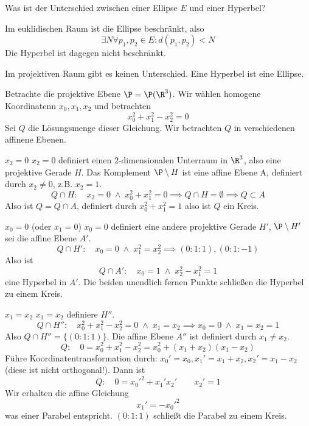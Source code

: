 \documentclass{mycourse}
\begin{document}
\begin{ex}[Quadriken]
	Was ist der Unterschied zwischen einer Ellipse $E$ und einer Hyperbel?

	Im euklidischen Raum ist die Ellipse beschränkt, also
	\[
		\exists N \forall p_1,p_2 \in E : d(p_1,p_2) < N
	\]
	Die Hyperbel ist dagegen nicht beschränkt.

	Im projektiven Raum gibt es keinen Unterschied.
	Eine Hyperbel ist eine Ellipse.

	Betrachte die projektive Ebene $\P = \P(\R^3)$.
	Wir wählen homogene Koordinatenn $x_0,x_1,x_2$ und betrachten
	\[
		x_0^2 + x_1^2 - x_2^2 = 0
	\]
	Sei $Q$ die Lösungsmenge dieser Gleichung.
	Wir betrachten $Q$ in verschiedenen affinene Ebenen.
	\begin{seg}{$x_2=0$}
		$x_2=0$ definiert einen $2$-dimensionalen Unterraum in $\R^3$, also eine projektive Gerade $H$.
		Das Komplement $\P\setminus H$ ist eine affine Ebene A, definiert durch $x_2 \neq 0$, z.B. $x_2=1$.
		\[
			Q \cap H : \quad x_2 = 0 \;\land\; x_0^2+x_1^2 = 0 \implies Q \cap H = \emptyset \implies Q \subset A
		\]
		Also ist $Q = Q \cap A$, definiert durch $x_0^2 + x_1^2 = 1$ also ist $Q$ ein Kreis.
	\end{seg}
	\begin{seg}{$x_0=0$ (oder $x_1=0$)}
		$x_0=0$ definiert eine andere projektive Gerade $H'$, $\P\setminus H'$ sei die affine Ebene $A'$.
		\[
			Q \cap H': \quad x_0 = 0 \;\land\; x_1^2 = x_2^2 \implies (0:1:1), (0:1:-1)
		\]
		Also ist
		\[
			Q \cap A' : \quad x_0=1 \;\land\; x_2^2-x_1^2=1
		\]
		eine Hyperbel in $A'$.
		Die beiden unendlich fernen Punkte schließen die Hyperbel zu einem Kreis.
	\end{seg}
	\begin{seg}{$x_1=x_2$}
		$x_1=x_2$ definiere $H''$.
		\[
			Q \cap H'' : \quad x_0^2 + x_1^2 - x_2^2 = 0 \;\land\; x_1=x_2 \implies  x_0=0 \;\land\; x_1=x_2=1
		\]
		Also $Q\cap H'' = \{(0:1:1)\}$.
		Die affine Ebene $A''$ ist definiert durch $x_1\neq x_2$.
		\[
			Q: \quad 0 = x_0^2 + x_1^2 -x_2^2 = x_0^2 + (x_1+x_2)(x_1-x_2)
		\]
		Führe Koordinatentransformation durch: $x_0' = x_0, x_1'=x_1+x_2, x_2'=x_1-x_2$ (diese ist nicht orthogonal!).
		Dann ist
		\[
			Q: \quad 0 =x_0'^2 + x_1'x_2' \qquad x_2'=1
		\]
		Wir erhalten die affine Gleichung
		\[
			x_1' = -x_0'^2
		\]
		was einer Parabel entspricht.
		$(0:1:1)$ schließt die Parabel zu einem Kreis.
	\end{seg}
\end{ex}
\end{document}
